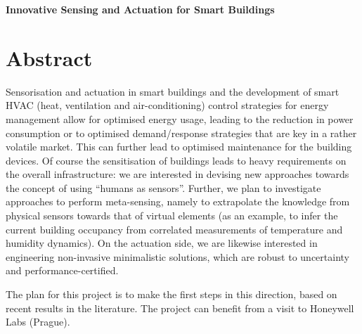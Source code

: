 \documentclass[]{article}
\begin{document}
\textbf{Innovative Sensing and Actuation for Smart Buildings}
\section{Abstract}
Sensorisation and actuation in smart buildings and the development of smart HVAC (heat, ventilation and air-conditioning) control strategies for energy management allow for optimised energy usage, leading to the reduction in power consumption or to optimised demand/response strategies that are key in a rather volatile market. This can further lead to optimised maintenance for the building devices.
Of course the sensitisation of buildings leads to heavy requirements on the overall infrastructure: we are interested in devising new approaches towards the concept of using ``humans as sensors''. Further, we plan to investigate approaches to perform meta-sensing, namely to extrapolate the knowledge from physical sensors towards that of virtual elements (as an example, to infer the current building occupancy from correlated measurements of temperature and humidity dynamics). On the actuation side, we are likewise interested in engineering non-invasive minimalistic solutions, which are robust to uncertainty and performance-certified.

The plan for this project is to make the first steps in this direction, based on recent results in the literature. The project can benefit from a visit to Honeywell Labs (Prague).
\end{document}
